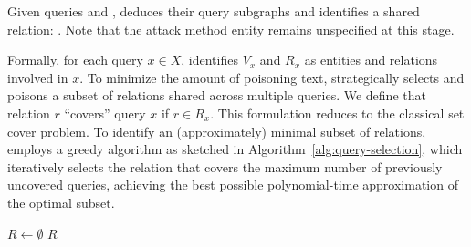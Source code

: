 \begin{mtbox}{}
\begin{example} 
\label{exp:cot}
Given queries  and , \attack deduces their query subgraphs and identifies a shared relation: . Note that the attack method entity remains unspecified at this stage.
\end{example}
\end{mtbox}

Formally, for each query $x \in X$, \attack identifies $V_x$ and $R_x$ as entities and relations involved in $x$. To minimize the amount of poisoning text, \attack strategically selects and poisons a subset of relations shared across multiple queries. We define that relation $r$ ``covers'' query $x$ if $r \in R_x$. This formulation reduces to the classical set cover problem. To identify an (approximately) minimal subset of relations, \attack employs a greedy algorithm as sketched in Algorithm~\ref{alg:query-selection}, which iteratively selects the relation that covers the maximum number of previously uncovered queries, achieving the best possible polynomial-time approximation of the optimal subset.

\begin{algorithm}\small 
{}
$R \leftarrow \emptyset$\;
\Return $R$\;
\caption{Selection of target relations. \label{alg:query-selection}}
\end{algorithm}





